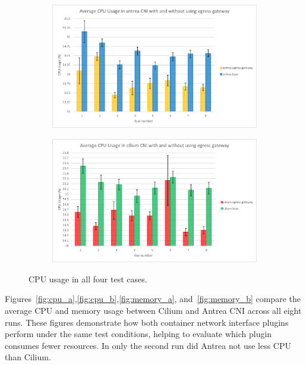 \begin{figure}[H]
    \begin{subfigure}[b]{0.35\textwidth}
        \includegraphics[width=\textwidth]{plots/small/cpu_antrea.png}
        \caption{}
        \label{fig:cpu_c}
    \end{subfigure}
    \hfill
    \begin{subfigure}[b]{0.35\textwidth}
        \includegraphics[width=\textwidth]{plots/small/cpu_cilium.png}
        \caption{}
        \label{fig:cpu_d}
    \end{subfigure}
    
    \caption{CPU usage in all four test cases.}
    \label{fig:cpuFour}
\end{figure}
Figures~\ref{fig:cpu_a},\ref{fig:cpu_b},\ref{fig:memory_a}, and~\ref{fig:memory_b} compare the average CPU and memory usage between Cilium and Antrea CNI across all eight runs. These figures demonstrate how both container network interface plugins perform under the same test conditions, helping to evaluate which plugin consumes fewer resources. In only the second run did Antrea not use less CPU than Cilium.
